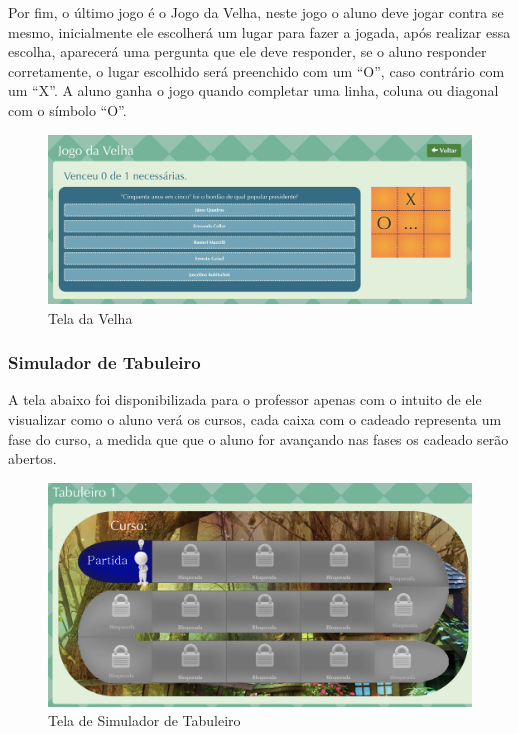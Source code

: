 Por fim, o último jogo é o Jogo da Velha, neste jogo o aluno deve jogar contra se mesmo, inicialmente ele escolherá um lugar para fazer a jogada, após realizar essa escolha, aparecerá uma pergunta que ele deve responder, se o aluno responder corretamente, o lugar escolhido será preenchido com um “O”, caso contrário com um “X”. A aluno ganha o jogo quando completar uma linha, coluna ou diagonal com o símbolo “O”.

\begin{figure}[H]
  \centering
  \includegraphics[scale=0.25]{images/proposta-img/Figura4-26.png}
  \caption{Tela da Velha}
  \label{fig:Figura4-26}
\end{figure}

\subsubsection{Simulador de Tabuleiro}

A tela abaixo foi disponibilizada para o professor apenas com o intuito de ele visualizar como o aluno verá os cursos, cada caixa com o cadeado representa um fase do curso, a medida que que o aluno for avançando nas fases os cadeado serão abertos.

\begin{figure}[H]
  \centering
  \includegraphics[scale=0.3]{images/proposta-img/Figura4-27.png}
  \caption{Tela de Simulador de Tabuleiro}
  \label{fig:Figura4-27}
\end{figure}

